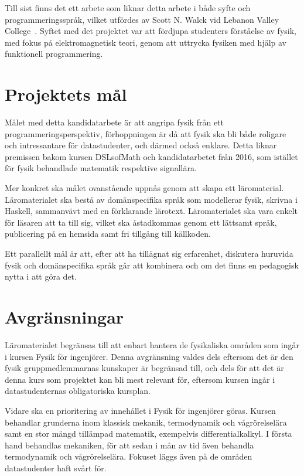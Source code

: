 Till sist finns det ett arbete som liknar detta arbete i både syfte och
programmeringsspråk, vilket utfördes av Scott N. Walck vid Lebanon Valley
College~\cite{lebanon-physics}. Syftet med det projektet var att fördjupa
studenters förståelse av fysik, med fokus på elektromagnetisk teori, genom att
uttrycka fysiken med hjälp av funktionell programmering.

\section{Projektets mål}

Målet med detta kandidatarbete är att angripa fysik från ett
programmeringsperspektiv, förhoppningen är då att fysik ska bli både
roligare och intressantare för datastudenter, och därmed också
enklare. Detta liknar premissen bakom kursen DSLsofMath och kandidatarbetet
från 2016, som istället för fysik behandlade matematik respektive signallära.

Mer konkret ska målet ovanstående uppnås genom att skapa ett läromaterial.
Läromaterialet ska bestå av
domänspecifika språk som modellerar fysik, skrivna
i Haskell,
sammanvävt med en förklarande lärotext. Läromaterialet ska vara
enkelt för läsaren att ta till sig, vilket ska åstadkommas genom ett lättsamt
språk, publicering på en hemsida samt fri tillgång till källkoden.

Ett parallellt mål är att, efter att ha tillägnat sig erfarenhet, diskutera
huruvida fysik och domänspecifika språk går att kombinera och om det finns en
pedagogisk nytta i att göra det.

\section{Avgränsningar}\label{sec:avgransningar}

Läromaterialet begränsas till att enbart hantera de fysikaliska områden
som ingår i kursen Fysik för ingenjörer. Denna avgränsning valdes dels eftersom
det är den fysik gruppmedlemmarnas kunskaper är begränsad till, och dels för att
det är denna kurs som projektet kan bli mest relevant för, eftersom
kursen ingår i datastudenternas obligatoriska kursplan.

Vidare ska en prioritering av innehållet i Fysik för ingenjörer göras.
Kursen behandlar grunderna inom klassisk mekanik, termodynamik och
vågrörelselära samt en stor mängd tillämpad matematik, exempelvis
differentialkalkyl. I första hand behandlas mekaniken, för att sedan i mån
av tid även behandla termodynamik och vågrörelselära. Fokuset läggs även
på de områden datastudenter haft svårt för.

